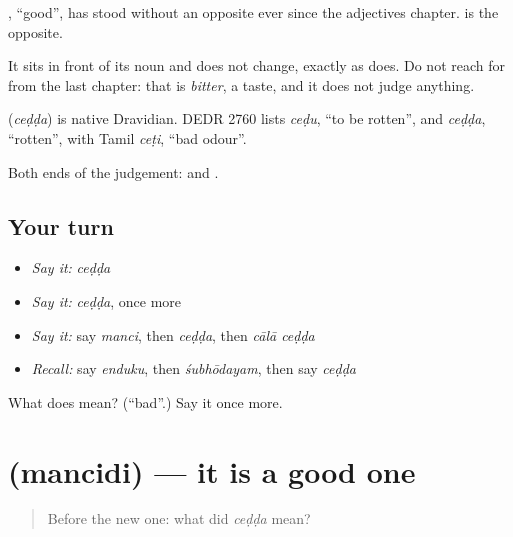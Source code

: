 , \textquotedblleft{}good\textquotedblright{}, has stood without an opposite ever since the adjectives chapter.  is the opposite.

It sits in front of its noun and does not change, exactly as  does. Do not reach for  from the last chapter: that is \emph{bitter}, a taste, and it does not judge anything.

\begin{cousinweb}
\textbf{} (\emph{ceḍḍa}) is native Dravidian. DEDR 2760 lists \emph{ceḍu}, \textquotedblleft{}to be rotten\textquotedblright{}, and \emph{ceḍḍa}, \textquotedblleft{}rotten\textquotedblright{}, with Tamil \emph{ceṭi}, \textquotedblleft{}bad odour\textquotedblright{}.
\end{cousinweb}

\begin{grammarlens}[title={What you've built}]
Both ends of the judgement:  and .
\end{grammarlens}

\subsection*{Your turn}
\begin{itemize}
\raggedright
  \item \emph{Say it:} \emph{ceḍḍa}
  \item \emph{Say it:} \emph{ceḍḍa}, once more
  \item \emph{Say it:} say \emph{manci}, then \emph{ceḍḍa}, then \emph{cālā ceḍḍa}
  \item \emph{Recall:} say \emph{enduku}, then \emph{śubhōdayam}, then say \emph{ceḍḍa}
\end{itemize}

\begin{tcolorbox}[breakable,colback=teal!4,colframe=teal!35!black,title={Before you move on}]
What does  mean? (\textquotedblleft{}bad\textquotedblright{}.) Say it once more.
\end{tcolorbox}
\section[\texorpdfstring{\te{మంచిది} (mancidi)}{మంచిది (mancidi)}]{ (mancidi) — it is a good one}

\label{lesson:TE-C76-itisgood}



\begin{quote}
Before the new one: what did \emph{ceḍḍa} mean?
\end{quote}

